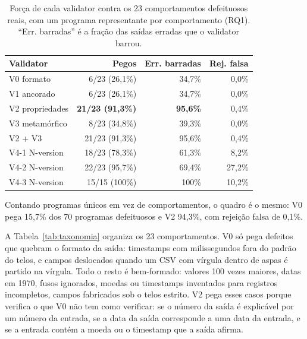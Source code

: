 \documentclass[sigconf,nonacm]{acmart}
\begin{document}
\begin{table}[t]
\caption{Força de cada validator contra os 23 comportamentos defeituosos reais, com um programa representante por comportamento (RQ1). ``Err. barradas'' é a fração das saídas erradas que o validator barrou.}
\label{tab:rq1}
\small
\begin{tabular}{lrrr}
\toprule
Validator & Pegos & Err. barradas & Rej. falsa \\
\midrule
V0 formato & 6/23 (26,1\%) & 34,7\% & 0,0\% \\
V1 ancorado & 6/23 (26,1\%) & 34,7\% & 0,0\% \\
V2 propriedades & \textbf{21/23 (91,3\%)} & \textbf{95,6\%} & 0,4\% \\
V3 metamórfico & 8/23 (34,8\%) & 39,3\% & 0,0\% \\
V2 + V3 & 21/23 (91,3\%) & 95,6\% & 0,4\% \\
V4-1 N-version & 18/23 (78,3\%) & 61,3\% & 8,2\% \\
V4-2 N-version & 22/23 (95,7\%) & 69,4\% & 27,2\% \\
V4-3 N-version & 15/15 (100\%) & 100\% & 10,2\% \\
\bottomrule
\end{tabular}
\end{table}

Contando programas únicos em vez de comportamentos, o quadro é o mesmo: V0 pega 15,7\% dos 70 programas defeituosos e V2 94,3\%, com rejeição falsa de 0,1\%.

A Tabela~\ref{tab:taxonomia} organiza os 23 comportamentos. V0 só pega defeitos que quebram o formato da saída: timestamps com milissegundos fora do padrão do telos, e campos deslocados quando um CSV com vírgula dentro de aspas é partido na vírgula. Todo o resto é bem-formado: valores 100 vezes maiores, datas em 1970, fusos ignorados, moedas ou timestamps inventados para registros incompletos, campos fabricados sob o telos estrito. V2 pega esses casos porque verifica o que V0 não tem como verificar: se o número da saída é explicável por um número da entrada, se a data da saída corresponde a uma data da entrada, e se a entrada contém a moeda ou o timestamp que a saída afirma.
\end{document}
